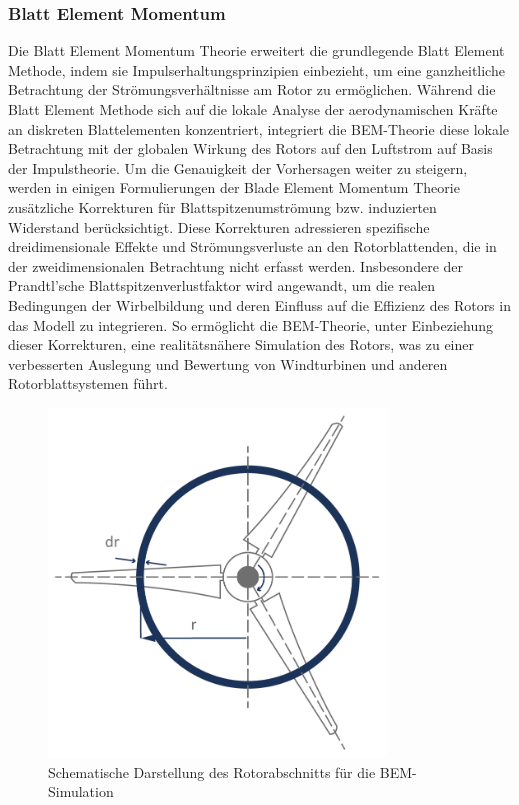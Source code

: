 \subsubsection{Blatt Element Momentum}
Die Blatt Element Momentum Theorie erweitert die grundlegende Blatt Element Methode, indem sie Impulserhaltungsprinzipien einbezieht, um eine ganzheitliche Betrachtung der Strömungsverhältnisse am Rotor zu ermöglichen. Während die Blatt Element Methode sich auf die lokale Analyse der aerodynamischen Kräfte an diskreten Blattelementen konzentriert, integriert die BEM-Theorie diese lokale Betrachtung mit der globalen Wirkung des Rotors auf den Luftstrom auf Basis der Impulstheorie.\cite{branlard_wind_2017}
Um die Genauigkeit der Vorhersagen weiter zu steigern, werden in einigen Formulierungen der Blade Element Momentum Theorie zusätzliche Korrekturen für Blattspitzenumströmung bzw. induzierten Widerstand berücksichtigt. Diese Korrekturen adressieren spezifische dreidimensionale Effekte und Strömungsverluste an den Rotorblattenden, die in der zweidimensionalen Betrachtung nicht erfasst werden. Insbesondere der Prandtl'sche Blattspitzenverlustfaktor wird angewandt, um die realen Bedingungen der Wirbelbildung und deren Einfluss auf die Effizienz des Rotors in das Modell zu integrieren. So ermöglicht die BEM-Theorie, unter Einbeziehung dieser Korrekturen, eine realitätsnähere Simulation des Rotors, was zu einer verbesserten Auslegung und Bewertung von Windturbinen und anderen Rotorblattsystemen führt. \cite{noauthor_blade_nodate}

\begin{figure}[h]
\centering
\includegraphics[width=0.8\textwidth]{figures/ringschnitt_rotor.png}
\caption{Schematische Darstellung des Rotorabschnitts für die BEM-Simulation \cite{noauthor_aerodynamik_nodate}}
\label{fig:ringschnitt}
\end{figure}

